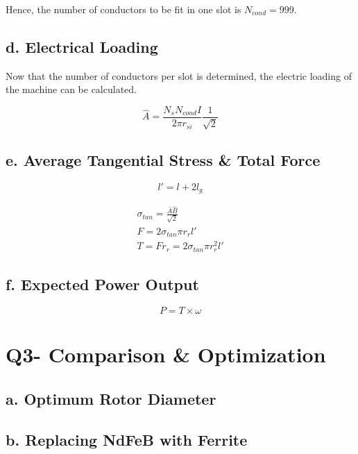\documentclass[a4paper, 11pt, titlepage]{article}
\begin{document}
Hence, the number of conductors to be fit in one slot is $N_{cond}=999$. 


\subsection{d. Electrical Loading}


Now that the number of conductors per slot is determined, the electric loading of the machine can be calculated.

\begin{equation}
	\hat{A} = \frac{N_sN_{cond}I}{2\pi r_{si}}\frac{1}{\sqrt{2}}
	\label{eq:specificElectricLoading}
\end{equation}

\subsection{e. Average Tangential Stress \& Total Force}

\begin{equation}
	l'=l+2l_g
	\label{eq:effectiveAxialLength}
\end{equation}


\begin{eqnarray}
	\sigma_{tan} = \frac{\bar{A}\hat{B}}{\sqrt{2}} \\
	F = 2\sigma_{tan}\pi r_{r}l' \\
	T = Fr_{r}= 2\sigma_{tan}\pi r^2_{r}l'
	\label{eq:specificElectricLoading}
\end{eqnarray}

\subsection{f. Expected Power Output}

\begin{equation}
	P=T\times\omega
\end{equation}


\section{Q3- Comparison \& Optimization}



\subsection{a. Optimum Rotor Diameter}

\subsection{b. Replacing NdFeB with Ferrite}
\end{document}

